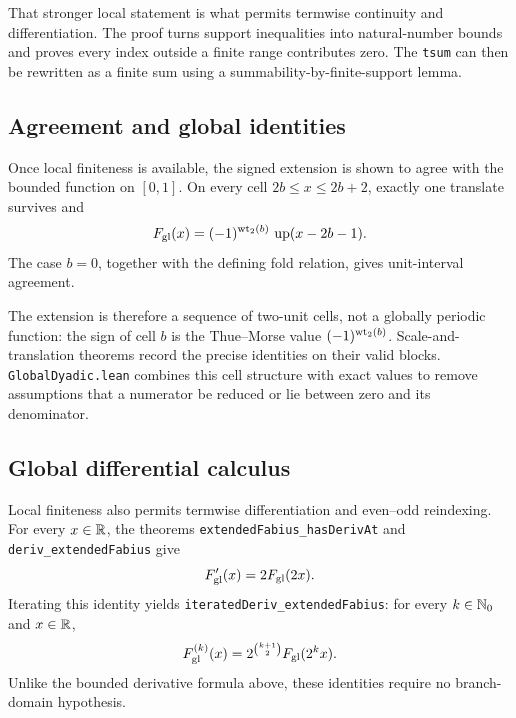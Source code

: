 \documentclass[11pt,oneside]{article}
\theoremstyle{definition}
\theoremstyle{remark}
\begin{document}
That stronger local statement is what permits termwise continuity and differentiation.  The proof turns support inequalities into natural-number bounds and proves every index outside a finite range contributes zero.  The \nolinkurl{tsum} can then be rewritten as a finite sum using a summability-by-finite-support lemma.

\subsection{Agreement and global identities}
Once local finiteness is available, the signed extension is shown to agree with the bounded function on \([0,1]\).  On every cell \(2b\leq x\leq2b+2\), exactly one translate survives and
\[
  F_{\mathrm{gl}}(x)=(-1)^{\operatorname{wt}_{2}(b)}\,\operatorname{up}(x-2b-1).
\]
The case \(b=0\), together with the defining fold relation, gives unit-interval agreement.

The extension is therefore a sequence of two-unit cells, not a globally periodic function: the sign of cell \(b\) is the Thue--Morse value \((-1)^{\operatorname{wt}_{2}(b)}\).  Scale-and-translation theorems record the precise identities on their valid blocks.  \nolinkurl{GlobalDyadic.lean} combines this cell structure with exact values to remove assumptions that a numerator be reduced or lie between zero and its denominator.

\subsection{Global differential calculus}
Local finiteness also permits termwise differentiation and even--odd
reindexing.  For every \(x\in\mathbb{R}\), the theorems
\nolinkurl{extendedFabius_hasDerivAt} and
\nolinkurl{deriv_extendedFabius} give
\[
  F_{\mathrm{gl}}'(x)=2F_{\mathrm{gl}}(2x).
\]
Iterating this identity yields \nolinkurl{iteratedDeriv_extendedFabius}:
for every \(k\in\mathbb{N}_{0}\) and \(x\in\mathbb{R}\),
\[
  F_{\mathrm{gl}}^{(k)}(x)
  =2^{\binom{k+1}{2}}F_{\mathrm{gl}}(2^k x).
\]
Unlike the bounded derivative formula above, these identities require no
branch-domain hypothesis.
\end{document}
